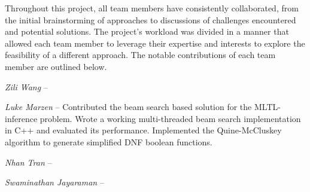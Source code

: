 \documentclass[12pt]{article}
\begin{document}
Throughout this project, all team members have consistently collaborated, from the initial brainstorming of approaches to discussions of challenges encountered and potential solutions. The project's workload was divided in a manner that allowed each team member to leverage their expertise and interests to explore the feasibility of a different approach. The notable contributions of each team member are outlined below.



\textit{Zili Wang} -- 

\textit{Luke Marzen} -- Contributed the beam search based solution for the MLTL-inference problem. Wrote a working multi-threaded beam search implementation in C++ and evaluated its performance. Implemented the Quine-McCluskey algorithm to generate simplified DNF boolean functions.

\textit{Nhan Tran} -- 

\textit{Swaminathan Jayaraman} -- 


\newpage
\end{document}
